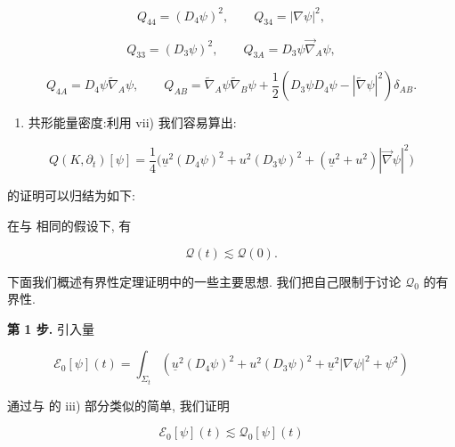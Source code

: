 \begin{equation}
Q _ {4 4} = (D _ {4} \psi) ^ {2},  \qquad Q _ {3 4} = | \nabla \psi | ^ {2}, \label{eq:cG-81}
\end{equation}

\begin{equation}
Q _ {3 3} = (D _ {3} \psi) ^ {2},  \qquad Q _ {3 A} = D _ {3} \psi \vec {\nabla} _ {A} \psi , \label{eq:cG-82}
\end{equation}

\begin{equation}
Q _ {4 A} = D _ {4} \psi \widetilde {\nabla} _ {A} \psi ,  \qquad Q _ {A B} = \widetilde {\nabla} _ {A} \psi \widetilde {\nabla} _ {B} \psi + \frac {1}{2} (D _ {3} \psi D _ {4} \psi - | \widetilde {\nabla} \psi | ^ {2}) \delta_ {A B}.\label{eq:cG-83}
\end{equation}

\begin{enumerate}
\def\labelenumi{\roman{enumi})}
\setcounter{enumi}{7}
\item 共形能量密度:利用 vii) 我们容易算出:
\end{enumerate}

\[
Q (K,  \partial_ {t}) [ \psi ] = \frac {1}{4} \big (\underline {u} ^ {2} (D _ {4} \psi) ^ {2} + u ^ {2} (D _ {3} \psi) ^ {2} + (\underline {u} ^ {2} + u ^ {2}) | \vec {\nabla} \psi | ^ {2} \big)
\]

 的证明可以归结为如下:

\begin{theorem}[有界性定理]\label{thm:cG-3.16}
在与 相同的假设下, 有

\[
\mathcal {Q} (t) \lesssim \mathcal {Q} (0).
\]
\end{theorem}

下面我们概述有界性定理证明中的一些主要思想. 我们把自己限制于讨论 $\mathcal{Q}_{0}$ 的有界性. 

\textbf{第 1 步.} 引入量

\begin{equation}
\mathcal {E} _ {0} [ \psi ] (t) = \int_ {\Sigma_ {t}} \left(\underline {u} ^ {2} (D _ {4} \psi) ^ {2} + u ^ {2} (D _ {3} \psi) ^ {2} + \underline {u} ^ {2} | \nabla \psi | ^ {2} + \psi^ {2}\right)\label{eq:cG-84}
\end{equation}

通过与 的 iii) 部分类似的简单, 我们证明

\begin{equation}
\mathcal {E} _ {0} [ \psi ] (t) \lesssim \mathcal {Q} _ {0} [ \psi ] (t)\label{eq:cG-85}
\end{equation}

